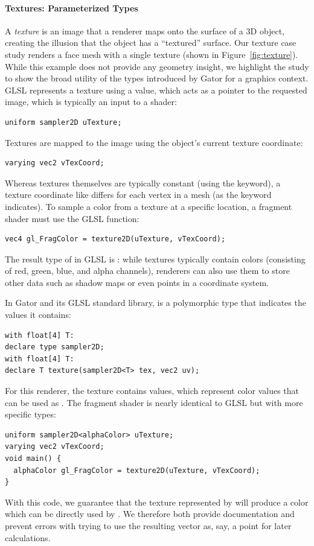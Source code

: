 {\paragraph{Textures: Parameterized Types}
A \emph{texture} is an image that a renderer maps onto the surface of a 3D object, creating the illusion that the object has a ``textured'' surface.
Our texture case study renders a face mesh with a single texture (shown in Figure~\ref{fig:texture}).
While this example does not provide any geometry insight, we highlight the study to show the broad utility of the types introduced by Gator for a graphics context.
GLSL represents a texture using a  value, which acts as a pointer to the requested image, which is typically an input to a shader:
%
\begin{lstlisting}
uniform sampler2D uTexture;
\end{lstlisting}
%
Textures are mapped to the image using the object's current texture coordinate:
%
\begin{lstlisting}
varying vec2 vTexCoord;
\end{lstlisting}
%
Whereas textures themselves are typically constant (using the  keyword), a texture coordinate like  differs for each vertex in a mesh (as the  keyword indicates).
To sample a color from a texture at a specific location, a fragment shader must use the GLSL  function:
%
\begin{lstlisting}
vec4 gl_FragColor = texture2D(uTexture, vTexCoord);
\end{lstlisting}
%
The result type of  in GLSL is : while textures typically contain colors (consisting of red, green, blue, and alpha channels), renderers can also use them to store other data such as shadow maps or even points in a coordinate system.

In Gator and its GLSL standard library,  is a polymorphic type that indicates the values it contains:
\begin{lstlisting}
with float[4] T:
declare type sampler2D;
with float[4] T:
declare T texture(sampler2D<T> tex, vec2 uv);
\end{lstlisting}
For this renderer, the texture contains  values, which represent color values that can be used as .
The fragment shader is nearly identical to GLSL but with more specific types:
%
\begin{lstlisting}
uniform sampler2D<alphaColor> uTexture;
varying vec2 vTexCoord;
void main() {
  alphaColor gl_FragColor = texture2D(uTexture, vTexCoord);
}
\end{lstlisting}
%
With this code, we guarantee that the texture represented by  will produce a color which can be directly used by .  We therefore both provide documentation and prevent errors with trying to use the resulting vector as, say, a point for later calculations.

}
